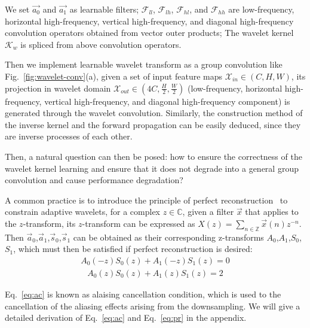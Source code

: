 \documentclass[10pt,twocolumn,letterpaper]{article}
\begin{document}
We set $\vec{a_0}$ and $\vec{a_1}$ as learnable filters; 
$\mathcal{F}_{ll}$, $\mathcal{F}_{lh}$, $\mathcal{F}_{hl}$, and $\mathcal{F}_{hh}$ are low-frequency, horizontal high-frequency, vertical high-frequency, and diagonal high-frequency convolution operators obtained from vector outer products; The wavelet kernel $\mathcal{K}_{w}$ is spliced from above convolution operators.
\par Then we implement learnable wavelet transform as a group convolution like Fig.~\ref{fig:wavelet-conv}(a), given a set of input feature maps $\mathcal{X}_{in} \in \left(C, H, W\right)$, its projection in wavelet domain $\mathcal{X}_{out} \in \left(4C, \frac{H}{2}, \frac{W}{2}\right)$ (low-frequency, horizontal high-frequency, vertical high-frequency, and diagonal high-frequency component) is generated through the wavelet convolution. 
Similarly, the construction method of the inverse kernel and the forward propagation can be easily deduced, since they are inverse processes of each other.
\par Then, a natural question can then be posed: how to ensure the correctness of the wavelet kernel learning and ensure that it does not degrade into a general group convolution and cause performance degradation?
\par A common practice is to introduce the principle of perfect reconstruction~\cite{wolter2021adaptive,liu2019multi} to constrain adaptive wavelets, for a complex $z \in \mathbb{C}$, given a filter $\vec{x}$ that applies to the $z$-transform, its $z$-transform can be expressed as $X(z) = \sum_{n \in \mathbb{Z}} \vec{x}(n) z^{-n} $. 
Then $\vec{a}_0$,$\vec{a}_1$,$\vec{s}_0$,$\vec{s}_1$ can be obtained as their corresponding z-transforms $A_{0}$,$A_{1}$,$S_{0}$,$S_1$, which must then be satisfied if perfect reconstruction is desired:
\begin{equation}
	\begin{aligned}
	A_0(-z)S_0(z) + A_1(-z)S_1(z) = 0
	\end{aligned}
	\label{eq:ac}
\end{equation}
\begin{equation}
	\begin{aligned}
	A_0(z)S_0(z) + A_1(z)S_1(z) = 2
	\end{aligned}
	\label{eq:pr}
\end{equation}
\par Eq.~\ref{eq:ac} is known as alaising cancellation condition, which is used to the cancellation of the aliasing effects arising from the downsampling.
We will give a detailed derivation of Eq.~\ref{eq:ac} and Eq.~\ref{eq:pr} in the appendix.
\end{document}
